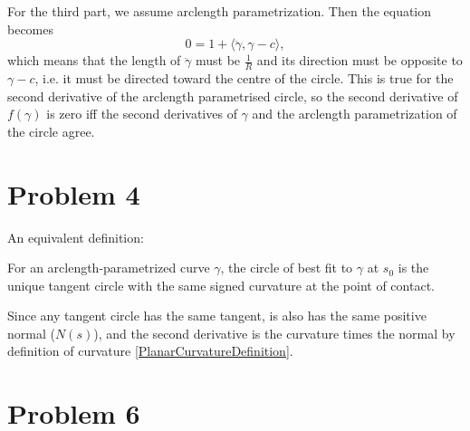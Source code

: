 For the third part, we assume arclength parametrization. Then the equation becomes
\[
0 = 1 + \langle \ddot\gamma, \gamma - c \rangle,
\]
which means that the length of \( \ddot\gamma \) must be \( \frac1R\) and its direction must be opposite to \(\gamma - c \), i.e. it must be directed toward the centre of the circle. This is true for the second derivative of the arclength parametrised circle, so the second derivative of \( f( \gamma ) \) is zero iff the second derivatives of \(\gamma\) and the arclength parametrization of the circle agree.

\section{Problem 4} An equivalent definition:

\begin{defn}
    For an arclength-parametrized curve \(\gamma\), the circle of best fit to \(\gamma\) at \( s_0 \) is the unique tangent circle with the same signed curvature at the point of contact.
\end{defn}

Since any tangent circle has the same tangent, is also has the same positive normal (\(N(s)\)), and the second derivative is the curvature times the normal by definition of curvature \ref{PlanarCurvatureDefinition}.

\section{Problem 6}

